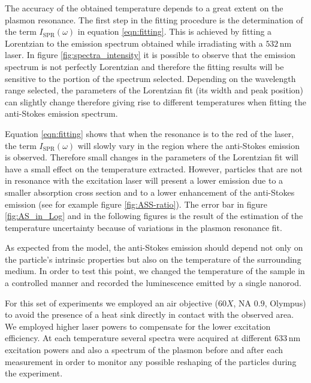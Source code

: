 \documentclass[journal=nalefd,manuscript=letter]{achemso}
\newcommand{\nm}{\ensuremath{\,\textrm{nm}}}
\begin{document}
The accuracy of the obtained temperature depends to a great extent on the
plasmon resonance. The first step in the fitting procedure is the determination
of the term $I_\textrm{SPR}(\omega)$ in equation \ref{eqn:fitting}. This is achieved by
fitting a Lorentzian to the emission spectrum obtained while irradiating with a
$532\nm$ laser. In figure \ref{fig:spectra_intensity} it is possible to observe
that the emission spectrum is not perfectly Lorentzian and therefore the fitting
results will be sensitive to the portion of the spectrum selected. Depending on
the wavelength range selected, the parameters of the Lorentzian fit (its width
and peak position) can slightly change therefore giving rise to different
temperatures when fitting the anti-Stokes emission spectrum.

Equation \ref{eqn:fitting} shows that when the resonance is to the red
of the laser, the term $I_\textrm{SPR}(\omega)$ will slowly vary in the region where the
anti-Stokes emission is observed. Therefore small changes in the parameters of
the Lorentzian fit will have a small effect on the temperature extracted.
However, particles that are not in resonance with the excitation laser will
present a lower emission due to a smaller absorption cross section and to a
lower enhancement of the anti-Stokes emission (see for example figure
\ref{fig:ASS-ratio}). 
The error bar in figure
\ref{fig:AS_in_Log} and in the following figures is the result of the estimation
of the temperature uncertainty because of variations in the plasmon resonance
fit.

As expected from the model, the anti-Stokes emission should depend not only on
the particle's intrinsic properties but also on the temperature of the
surrounding medium\cite{Konrad2013}. In order to test this point, we changed the
temperature of the sample in a controlled manner and recorded the luminescence
emitted by a single nanorod.

For this set of experiments we employed an air objective ($60X$, NA $0.9$,
Olympus) to avoid the presence of a heat sink directly in contact with the
observed area. We employed higher laser powers to compensate for the lower
excitation efficiency. At each temperature several spectra were acquired at different
$633\nm$ excitation powers and also a spectrum of the plasmon before and after
each measurement in order to monitor any possible reshaping of the particles
during the experiment.
\end{document}
